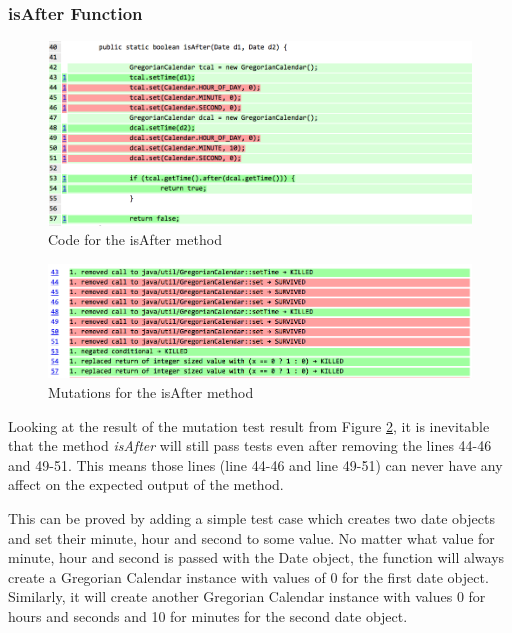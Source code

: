 \documentclass[fontsize=12pt,paper=letter,twoside]{scrartcl}
\begin{document}
\subsubsection{isAfter Function}
\begin{figure}[!htb]
\begin{center}
\includegraphics[width=.99\textwidth]{images/MutationTesting/isAfterCode.png}
\end{center}
\caption{Code for the isAfter method}
\label{fig:isAfterCode}
\end{figure}

\clearpage
\begin{figure}[!htb]
\begin{center}
\includegraphics[width=.99\textwidth]{images/MutationTesting/isAfterMutant.png}
\end{center}
\caption{Mutations for the isAfter method}
\label{fig:isAfterMutant}
\end{figure}


\noindent Looking at the result of the mutation test result from Figure \ref{fig:isAfterMutant}, it is inevitable that the method \emph{isAfter} will still pass tests even after removing the lines 44-46 and 49-51. This means those lines (line 44-46 and line 49-51) can never have any affect on the expected output of the method.

\bigskip
\noindent This can be proved by adding a simple test case which creates two date objects and set their minute, hour and second to some value. No matter what value for minute, hour and second is passed with the Date object, the function will always create a Gregorian Calendar instance with values of 0 for the first date object. Similarly, it will create another Gregorian Calendar instance with values 0 for hours and seconds and 10 for minutes for the second date object.
\end{document}
